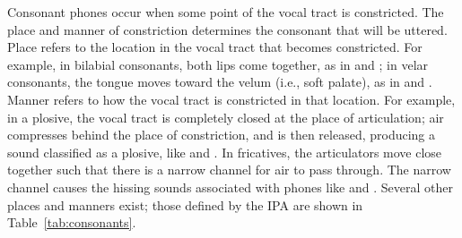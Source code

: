 Consonant phones occur when some point
of the vocal tract is constricted.
The place and manner of constriction
determines the consonant that will be uttered.
Place refers to the location in the vocal tract
that becomes constricted.
For example, in bilabial consonants,
both lips come together,
as in \ipa{[m]} and \ipa{[b]};
in velar consonants,
the tongue moves toward the velum
(i.e., soft palate),
as in \ipa{[k]} and \ipa{[g]}.
Manner refers to how the vocal tract
is constricted in that location.
For example, in a plosive,
the vocal tract is completely closed
at the place of articulation;
air compresses behind the place of constriction,
and is then released,
producing a sound classified
as a plosive, like \ipa{[t]} and \ipa{[k]}.
In fricatives,
the articulators move close together
such that there is a narrow channel
for air to pass through.
The narrow channel causes
the hissing sounds associated
with phones like \ipa{[s]} and \ipa{[f]}.
Several other places and manners exist;
those defined by the IPA are shown
in Table~\ref{tab:consonants}.

